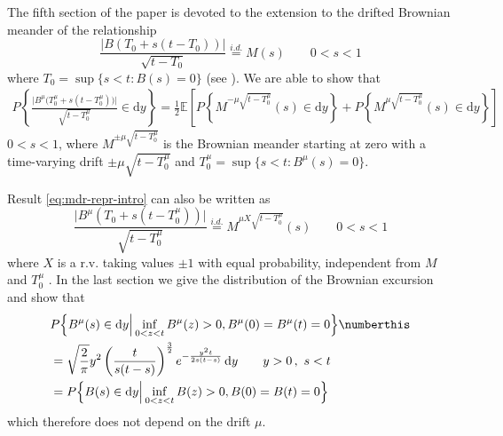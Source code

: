 The fifth section of the paper is devoted to the extension to the drifted Brownian meander of the 
relationship
\begin{equation}\label{eq:mdr-repr-0-intro}
\frac{
	\Big|  B(T_0 + s (t - T_0)) \Big|
}{\sqrt{t - T_0}}
\stackrel{i.d.}{=} M(s) \qquad 0 < s < 1
\end{equation}
where $ T_0 = \sup \{s < t : B(s) = 0\} $ (see \citet{pitman99}). 
We are able to show  that 
%
%
\begin{align}\label{eq:mdr-repr-intro}
P\left\{   
\frac { 
	\Big | B^\mu\Big ( T_0^\mu + s ( t - T_0^\mu) \Big )  \Big |    
}
{
	\sqrt{t - T^\mu_0}
} \in \mathrm d y 
\right\} = 
\frac 12 
\mathbb E \left[
P\left\{ M^{- \mu \sqrt{ t - T_0^\mu}}(s) \in\mathrm d y \right\} + 
P\left\{ M^{\mu \sqrt{ t - T_0^\mu}} (s)\in\mathrm d y \right\} 
\right]
\end{align}
$ 0 < s < 1 $, where  $M^{\pm \mu \sqrt{ t - T_0^\mu}}$ is the Brownian meander starting at zero
with a time-varying drift $ \pm \mu \sqrt{ t - T_0^\mu} $ and $ T_0^\mu = \sup\{s < t: B^\mu(s) = 0\} $. 



Result \eqref{eq:mdr-repr-intro} can also be written as
\begin{equation}
	\frac{
		\Big|  B^\mu(T_0 + s (t - T^\mu_0)) \Big|
	}{\sqrt{t - T^\mu_0}}
	\stackrel{i.d.}{=} M^{\mu X \sqrt{ t - T_0^\mu} }(s) \qquad 0 < s < 1
\end{equation}
where $ X $ is a r.v. taking values $ \pm 1 $ with equal probability, independent from $ M $ and $ T^\mu_0 $ . 
%
%
In the last section we give the distribution of the Brownian excursion and show that
%
	\begin{align*}
	& 
	P\Big\{ B^\mu (s ) \in \mathrm d y \Big | \inf_{ 0 < z < t } B^\mu ( z)> 0, B^\mu ( 0) =  B^\mu ( t) = 0 \Big\}
	\numberthis \label{eq:exc-intro} \\
	&=
	\sqrt \frac{2}{\pi} y^2 \left(\frac{t}{s(t-s)}\right) ^\frac 32 
	e^{- \frac{ y^2t}{ 2 s (t-s)}} \, \mathrm d y \qquad y>0 \,,\,\, s<t
	\\
	&=
	P\Big\{  B(s ) \in \mathrm d y \Big | \inf_{ 0 < z < t } B ( z)> 0, B ( 0) =  B ( t) = 0 \Big\} 
	\end{align*}
which therefore does not depend on the drift $ \mu $.
%
%
%


